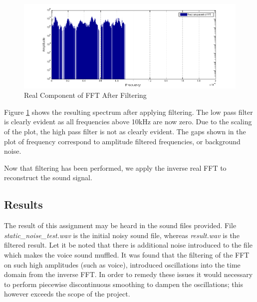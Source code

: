 \begin{figure}[H]
    \label{fig:afterFilt}
    \centering
        \includegraphics[width=6.5in]{./include/afterfig.png}
        \caption{Real Component of FFT After Filtering}
\end{figure}
Figure \ref{fig:afterFilt} shows the resulting spectrum after applying filtering. The low pass filter is clearly evident as all frequencies above 10kHz are now zero. Due to the scaling of the plot, the high pass filter is not as clearly evident. The gaps shown in the plot of frequency correspond to amplitude filtered frequencies, or background noise.

Now that filtering has been performed, we apply the inverse real FFT to reconstruct the sound signal.
\subsection{Results} %
\label{sub:results}
The result of this assignment may be heard in the sound files provided. File \emph{static\_noise\_test.wav} is the initial noisy sound file, whereas \emph{result.wav} is the filtered result. Let it be noted that there is additional noise introduced to the file which makes the voice sound muffled. It was found that the filtering of the FFT on such high amplitudes (such as voice), introduced oscillations into the time domain from the inverse FFT. In order to remedy these issues it would necessary to perform piecewise discontinuous smoothing to dampen the oscillations; this however exceeds the scope of the project.


